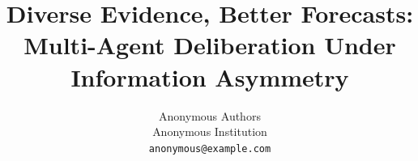 \documentclass[11pt]{article}
\title{Diverse Evidence, Better Forecasts: \\ Multi-Agent Deliberation Under Information Asymmetry}
\author{Anonymous Authors \\
  Anonymous Institution \\
  \texttt{anonymous@example.com}}
\theoremstyle{plain}
\theoremstyle{definition}
\begin{document}
\maketitle

\begin{abstract}

\end{abstract}











\appendix

\end{document}
